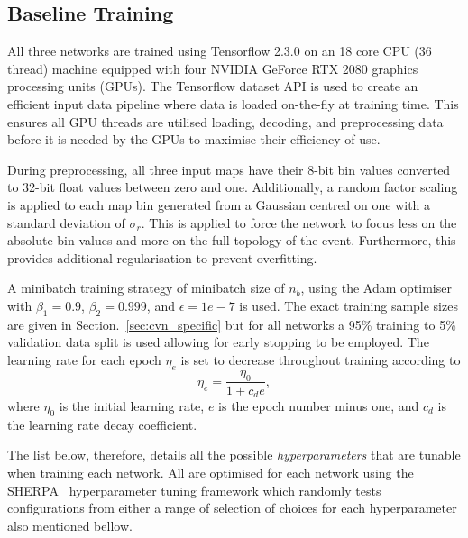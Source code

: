 \subsection{Baseline Training} %
\label{sec:cvn_baseline_training} %

All three networks are trained using Tensorflow 2.3.0 on an 18 core CPU (36 thread) machine
equipped with four NVIDIA GeForce RTX 2080 graphics processing units (GPUs). The Tensorflow
dataset API is used to create an efficient input data pipeline where data is loaded on-the-fly at
training time. This ensures all GPU threads are utilised loading, decoding, and preprocessing data
before it is needed by the GPUs to maximise their efficiency of use.

During preprocessing, all three input maps have their 8-bit bin values converted to 32-bit float
values between zero and one. Additionally, a random factor scaling is applied to each map bin
generated from a Gaussian centred on one with a standard deviation of $\sigma_{r}$. This is
applied to force the network to focus less on the absolute bin values and more on the full
topology of the event. Furthermore, this provides additional regularisation to prevent
overfitting.

A minibatch training strategy of minibatch size of $n_{b}$, using the Adam
optimiser~\cite{kingma2014} with $\beta_{1}=0.9$, $\beta_{2}=0.999$, and $\epsilon = 1e-7$ is
used. The exact training sample sizes are given in Section.~\ref{sec:cvn_specific} but for all
networks a 95\% training to 5\% validation data split is used allowing for early stopping to be
employed. The learning rate for each epoch $\eta_{e}$ is set to decrease throughout training
according to
\begin{equation}
    \eta_{e}=\frac{\eta_{0}}{1+c_{d}e},
\end{equation}
where $\eta_{0}$ is the initial learning rate, $e$ is the epoch number minus one, and $c_{d}$ is
the learning rate decay coefficient.

The list below, therefore, details all the possible \emph{hyperparameters} that are tunable when
training each network. All are optimised for each network using the SHERPA~\cite{hertel2020}
hyperparameter tuning framework which randomly tests configurations from either a range of
selection of choices for each hyperparameter also mentioned bellow.

